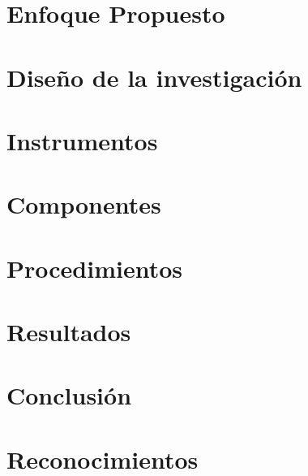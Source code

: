 \documentclass[journal]{IEEEtran}
\begin{document}
\section{Enfoque Propuesto}


\section{Diseño de la investigación}


\section{Instrumentos}


\section{Componentes}


\section{Procedimientos}


\section{Resultados}


\section{Conclusión}


\appendices


\section*{Reconocimientos}





\end{document}
